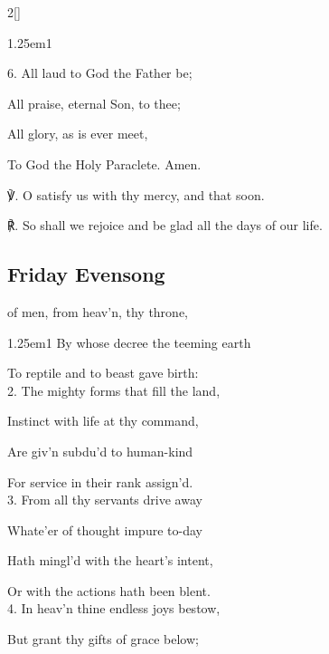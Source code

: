 \begin{paracol}{2}[]
\begin{hangparas}{1.25em}{1}
\vspace{0.5\baselineskip}

6. All laud to God the Father be;

All praise, eternal Son, to thee;

All glory, as is ever meet,

To God the Holy Paraclete. Amen.%

\vspace{0.5\baselineskip}

\end{hangparas}

℣. O satisfy us with thy mercy, and that soon.

℟. So shall we rejoice and be glad all the days of our life.


\switchcolumn

\subsection{Friday Evensong}\label{FridayEvensong}

 of men, from heav'n, thy throne,


\begin{hangparas}{1.25em}{1}
By whose decree the teeming earth

To reptile and to beast gave birth:\\

2. The mighty forms that fill the land,

Instinct with life at thy command,

Are giv'n subdu'd to human-kind

For service in their rank assign'd.\\

3. From all thy servants drive away

Whate'er of thought impure to-day

Hath mingl'd with the heart's intent,

Or with the actions hath been blent.\\

4. In heav'n thine endless joys bestow,

But grant thy gifts of grace below;


\end{hangparas}
\end{paracol}
